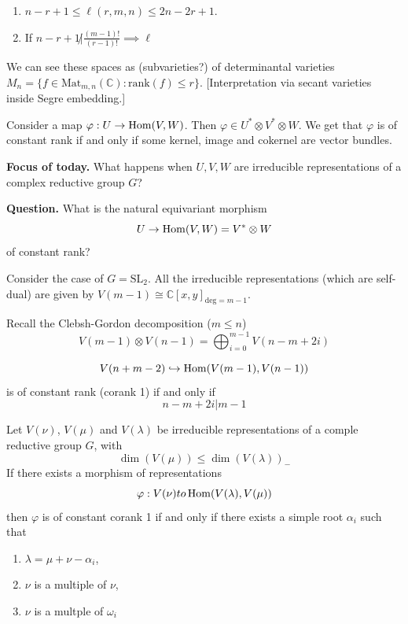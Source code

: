 \begin{theorem}[Westwick '86]
\label{theorem-Westwick}
\begin{enumerate}
\item $n-r+1 \leq \ell(r,m,n) \leq 2n-2r+1$.
\item If $n-r+1 \not|
\frac{(m-1)!}{(r-1)!}\implies \ell$
\end{enumerate}
\end{theorem}

We can see these spaces as (subvarieties?) of
determinantal varieties
$M_n=\{f \in
\text{Mat}_{m,n}(\mathbb{C}):\text{rank}(f)
\leq  r\}$.
[Interpretation via secant varieties inside
Segre embedding.]

\medskip\noindent
Consider a map $\varphi: U \to \mathop{\mathrm{Hom}}\nolimits(V,W)$.
Then $\varphi \in U^* \otimes  V^* \otimes
W$.
We get that
$\varphi$ is of constant rank if and only if
some kernel, image and cokernel are vector
bundles.

\medskip\noindent
{\bf Focus of today.} What happens when
$U,V,W$ are irreducible
representations of a complex reductive group
$G$?

\medskip\noindent
{\bf Question.} What is the natural
equivariant morphism
$$
U \to \mathop{\mathrm{Hom}}\nolimits(V,W)=V^* \otimes  W
$$
of constant rank?

\medskip\noindent
Consider the case of $G=\text{SL}_2$. All the
irreducible representations (which are
self-dual) are given by
$V(m-1)\cong
\mathbb{C}[x,y]_{\text{deg}=m-1}$.

Recall the Clebsh-Gordon decomposition ($m
\leq  n$)
$$
V(m-1)\otimes
V(n-1)=\bigoplus_{i=0}^{m-1}V(n-m+2i)
$$

\begin{theorem}
\label{theorem-BFL22}
$$
V(n+m-2)\hookrightarrow \mathop{\mathrm{Hom}}\nolimits(V(m-1),V(n-1))
$$
is of constant rank (corank 1) if and only if
$$
n-m+2i|m-1
$$
\end{theorem}

\begin{theorem}
\label{theorem-BFF25}
Let $V(\nu)$, $V(\mu)$ and $V(\lambda)$ be
irreducible representations
of a comple reductive group $G$, with
$$
\dim(V(\mu)) \leq \dim(V(\lambda))_-
$$
If there exists a morphism of representations
$$
\varphi: V (\nu) to \mathop{\mathrm{Hom}}\nolimits (V (\lambda),V(\mu))
$$
then $\varphi$ is of constant corank 1 if and
only if
there exists a simple root $\alpha_i$ such
that
\begin{enumerate}
\item $\lambda=\mu+\nu-\alpha_i$,
\item $\nu$ is a multiple of $\nu$,
\item  $\nu$ is a multple of $\omega_i$
\end{enumerate}
\end{theorem}

